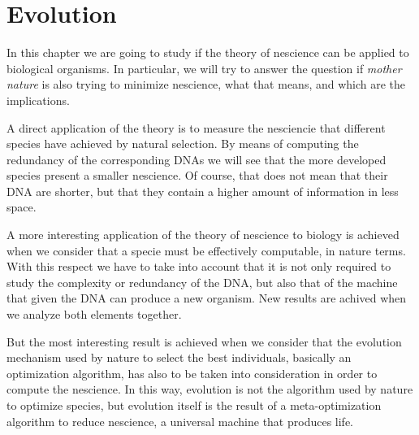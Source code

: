 %
%


\chapter{Evolution}
\label{chap:evolution}

In this chapter we are going to study if the theory of nescience can be applied to biological organisms. In particular, we will try to answer the question if \emph{mother nature} is also trying to minimize nescience, what that means, and which are the implications.

A direct application of the theory is to measure the nesciencie that different species have achieved by natural selection. By means of computing the redundancy of the corresponding DNAs we will see that the more developed species present a smaller nescience. Of course, that does not mean that their DNA are shorter, but that they contain a higher amount of information in less space.

A more interesting application of the theory of nescience to biology is achieved when we consider that a specie must be effectively computable, in nature terms. With this respect we have to take into account that it is not only required to study the complexity or redundancy of the DNA, but also that of the machine that given the DNA can produce a new organism. New results are achived when we analyze both elements together.

But the most interesting result is achieved when we consider that the evolution mechanism used by nature to select the best individuals, basically an optimization algorithm, has also to be taken into consideration in order to compute the nescience. In this way, evolution is not the algorithm used by nature to optimize species, but evolution itself is the result of a meta-optimization algorithm to reduce nescience, a universal machine that produces life.

